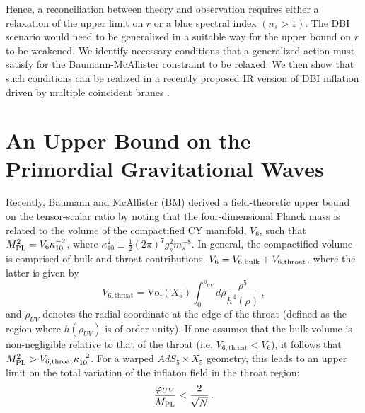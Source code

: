 Hence, a reconciliation between theory and observation 
requires either a relaxation of the upper limit on $r$ or a blue 
spectral index $(n_s >1)$. The DBI scenario would need 
to be generalized in a suitable way for the upper bound on $r$
to be weakened. We identify necessary conditions that a 
generalized action must satisfy for the Baumann-McAllister
 constraint to be relaxed. 
We then show that such conditions can be realized in a recently 
proposed IR version of DBI inflation driven
by multiple coincident branes \cite{thomasward}. 

% 
% 
\section{An Upper Bound on the Primordial Gravitational Waves}
% 
\label{sec:upper-dbi}
%

Recently, Baumann and McAllister (BM) \cite{bmpaper} 
derived a field-theoretic upper bound on the tensor-scalar ratio 
by noting that the four-dimensional Planck mass is related 
to the volume of the compactified CY manifold, $V_6$, such that 
$M_{\mathrm{PL}}^2=V_6 \kappa_{10}^{-2}$, where $\kappa_{10}^2 \equiv 
\frac{1}{2} (2\pi )^7 g_s^2 m_s^{-8}$.
In general, the compactified volume 
is comprised of bulk and throat contributions, 
$V_6 = V_{6,{\rm bulk}}+V_{6,{\rm throat}}$, where the latter is 
given by
% 
\begin{equation}
\label{eq:throatvolume}
V_{6,\mathrm{throat}} = \mathrm{Vol}(X_5)  
\int_0^{\rho_{UV}} d\rho \frac{\rho^5}{h^4(\rho )} \,,
\end{equation}
% 
and $\rho_{UV}$ denotes the radial coordinate at 
the edge of the throat (defined as the region 
where $h (\rho_{UV})$ is of order unity). 
If one assumes that the bulk volume is 
non-negligible relative to 
that of the throat (i.e. $V_{6,\mathrm{throat}} < V_{6}$), 
it follows that $M_{\mathrm{PL}}^2> V_{6,\mathrm{throat}}\kappa_{10}^{-2}$. 
For a warped $AdS_5 \times X_5$ geometry, this leads to an 
upper limit on the total variation of the inflaton field in 
the throat region:
% 
\begin{equation}
\label{eq:BMbound-dbi}
\frac{\varphi_{UV}}{M_{\mathrm{PL}}}   < \frac{2}{\sqrt{N}} \,.
\end{equation}
% 


